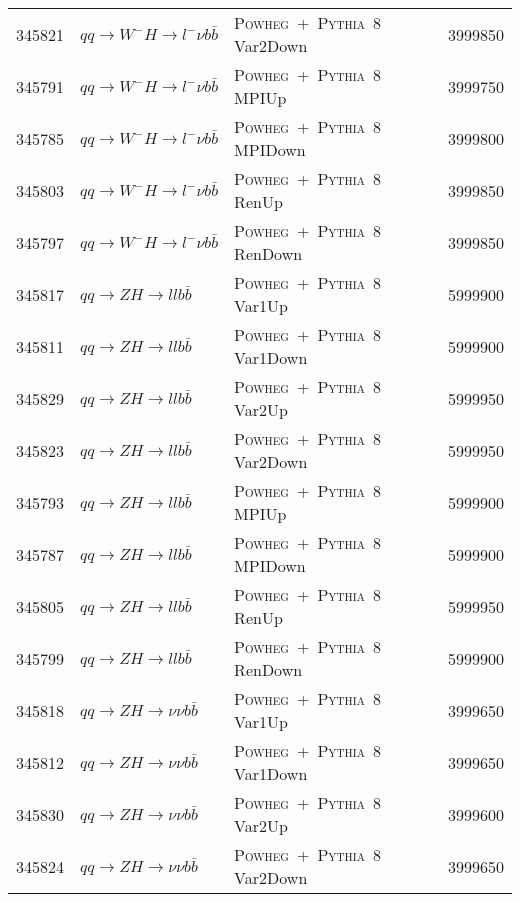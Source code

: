 \begin{table}[ht!b]
{\begin{tabular}{rllr}
      345821 & $qq\to W^{-}H \to l^{-}\nu b\bar{b}$         & \textsc{Powheg}~+~\textsc{Pythia}~8  Var2Down & 3999850 \\
      345791 & $qq\to W^{-}H \to l^{-}\nu b\bar{b}$         & \textsc{Powheg}~+~\textsc{Pythia}~8  MPIUp & 3999750 \\
      345785 & $qq\to W^{-}H \to l^{-}\nu b\bar{b}$         & \textsc{Powheg}~+~\textsc{Pythia}~8  MPIDown & 3999800 \\
      345803 & $qq\to W^{-}H \to l^{-}\nu b\bar{b}$         & \textsc{Powheg}~+~\textsc{Pythia}~8  RenUp & 3999850 \\
      345797 & $qq\to W^{-}H \to l^{-}\nu b\bar{b}$         & \textsc{Powheg}~+~\textsc{Pythia}~8  RenDown & 3999850 \\
      345817 & $qq\to ZH \to ll b\bar{b}$                   & \textsc{Powheg}~+~\textsc{Pythia}~8  Var1Up & 5999900 \\
      345811 & $qq\to ZH \to ll b\bar{b}$                   & \textsc{Powheg}~+~\textsc{Pythia}~8  Var1Down & 5999900 \\
      345829 & $qq\to ZH \to ll b\bar{b}$                   & \textsc{Powheg}~+~\textsc{Pythia}~8  Var2Up & 5999950 \\
      345823 & $qq\to ZH \to ll b\bar{b}$                   & \textsc{Powheg}~+~\textsc{Pythia}~8  Var2Down & 5999950 \\
      345793 & $qq\to ZH \to ll b\bar{b}$                   & \textsc{Powheg}~+~\textsc{Pythia}~8  MPIUp & 5999900 \\
      345787 & $qq\to ZH \to ll b\bar{b}$                   & \textsc{Powheg}~+~\textsc{Pythia}~8  MPIDown & 5999900 \\
      345805 & $qq\to ZH \to ll b\bar{b}$                   & \textsc{Powheg}~+~\textsc{Pythia}~8  RenUp & 5999950 \\
      345799 & $qq\to ZH \to ll b\bar{b}$                   & \textsc{Powheg}~+~\textsc{Pythia}~8  RenDown & 5999900 \\
      345818 & $qq\to ZH \to \nu\nu b\bar{b}$  & \textsc{Powheg}~+~\textsc{Pythia}~8  Var1Up & 3999650 \\
      345812 & $qq\to ZH \to \nu\nu b\bar{b}$  & \textsc{Powheg}~+~\textsc{Pythia}~8  Var1Down & 3999650 \\
      345830 & $qq\to ZH \to \nu\nu b\bar{b}$  & \textsc{Powheg}~+~\textsc{Pythia}~8  Var2Up & 3999600 \\
      345824 & $qq\to ZH \to \nu\nu b\bar{b}$  & \textsc{Powheg}~+~\textsc{Pythia}~8  Var2Down & 3999650 \\

\end{tabular}}
\end{table}
